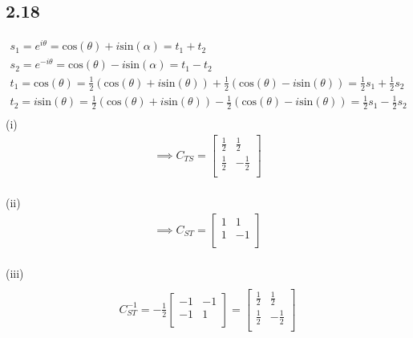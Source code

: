 \documentclass[letterpaper,12pt]{article}
\theoremstyle{definition}
\begin{document}
\subsection*{2.18}
\begin{align*}
    s_1 = e^{i \theta} = \text{cos} (\theta) + i \text{sin} (\alpha) = t_1 + t_2 
    \\s_2 = e^{-i \theta} = \text{cos} (\theta) - i \text{sin} (\alpha) = t_1 - t_2
    \\t_1 = \text{cos} (\theta) = \frac{1}{2}(\text{cos} (\theta) + i \text{sin} (\theta) ) + \frac{1}{2}(\text{cos} (\theta) - i \text{sin} (\theta) ) = \frac{1}{2}s_1 + \frac{1}{2}s_2 
    \\t_2 = i\text{sin} (\theta) = \frac{1}{2}(\text{cos} (\theta) + i \text{sin} (\theta) ) - \frac{1}{2}(\text{cos} (\theta) - i \text{sin} (\theta) ) = \frac{1}{2}s_1 - \frac{1}{2}s_2 
    \\
\end{align*}
    (i)\\
\begin{align*}
    \implies 
    C_{TS}=
    \begin{bmatrix}
        \frac{1}{2} & \frac{1}{2}\\
        \frac{1}{2} & -\frac{1}{2}\\
    \end{bmatrix}
\end{align*}
    \\(ii)\\
\begin{align*}
    \implies 
    C_{ST}=
    \begin{bmatrix}
        1 & 1\\
        1 & -1\\
    \end{bmatrix}
\end{align*}
    \\(iii)\\
\begin{align*}
    \\ C_{ST}^{-1} = -\frac{1}{2}
    \begin{bmatrix}
        -1 & -1 \\
        -1 & 1 \\
    \end{bmatrix}
    =
    \begin{bmatrix}
        \frac{1}{2} & \frac{1}{2}\\
        \frac{1}{2} & -\frac{1}{2}\\
    \end{bmatrix}
\end{align*}
\end{document}
